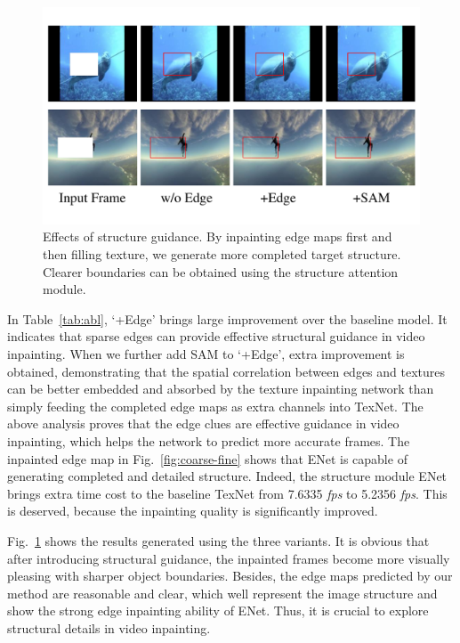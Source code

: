 \begin{figure}[t]
	\centering
	\includegraphics[width=0.97\columnwidth]{edgevis} %
	\caption{Effects of structure guidance. By inpainting edge maps first and then filling texture, we generate more completed target structure. Clearer boundaries can be obtained using the structure attention module.}
	\label{edgevis}
\end{figure}



In Table~\ref{tab:abl}, `+Edge' brings large improvement over the baseline model.
It indicates that sparse edges can provide effective structural guidance in video inpainting.
When we further add SAM to `+Edge', extra improvement is obtained, demonstrating that the spatial correlation between edges and textures can be better embedded and absorbed by the texture inpainting network than simply feeding the completed edge maps as extra channels into TexNet.
The above analysis proves that the edge clues are effective guidance in video inpainting, which helps the network to predict more accurate frames.
The inpainted edge map in Fig.~\ref{fig:coarse-fine} shows that ENet is capable of generating completed and detailed structure.
Indeed, the structure module ENet brings extra time cost to the baseline TexNet from 7.6335 \emph{fps} to 5.2356 \emph{fps}.
This is deserved, because the inpainting quality is significantly improved.

Fig.~\ref{edgevis} shows the results generated using the three variants. 
It is obvious that after introducing structural guidance, the inpainted frames become more visually pleasing with sharper object boundaries. 
Besides, the edge maps predicted by our method are reasonable and clear, which well represent the image structure and show the strong edge inpainting ability of ENet. 
Thus, it is crucial to explore structural details in video inpainting.
 



